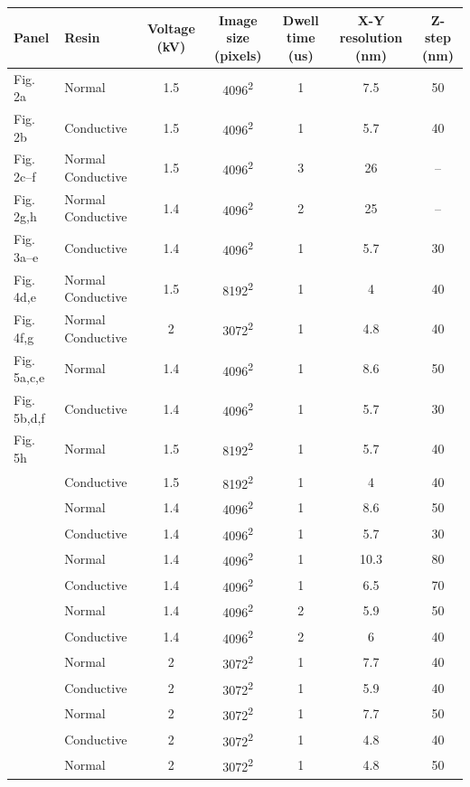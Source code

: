 \documentclass{article}
\begin{document}
\begin{center}\small
\begin{tabular}{llccccc}
\toprule
Panel & Resin & Voltage (kV) & Image size (pixels) & Dwell time (us) & X-Y resolution (nm) & Z-step (nm) \\
\midrule
Fig. 2a & Normal & 1.5 & 4096\textsuperscript{2} & 1 & 7.5 & 50 \\
Fig. 2b & Conductive & 1.5 & 4096\textsuperscript{2} & 1 & 5.7 & 40 \\
Fig. 2c–f & Normal Conductive & 1.5 & 4096\textsuperscript{2} & 3 & 26 & – \\
Fig. 2g,h & Normal Conductive & 1.4 & 4096\textsuperscript{2} & 2 & 25 & – \\
Fig. 3a–e & Conductive & 1.4 & 4096\textsuperscript{2} & 1 & 5.7 & 30 \\
Fig. 4d,e & Normal Conductive & 1.5 & 8192\textsuperscript{2} & 1 & 4 & 40 \\
Fig. 4f,g & Normal Conductive & 2 & 3072\textsuperscript{2} & 1 & 4.8 & 40 \\
Fig. 5a,c,e & Normal & 1.4 & 4096\textsuperscript{2} & 1 & 8.6 & 50 \\
Fig. 5b,d,f & Conductive & 1.4 & 4096\textsuperscript{2} & 1 & 5.7 & 30 \\
Fig. 5h & Normal & 1.5 & 8192\textsuperscript{2} & 1 & 5.7 & 40 \\
 & Conductive & 1.5 & 8192\textsuperscript{2} & 1 & 4 & 40 \\
 & Normal & 1.4 & 4096\textsuperscript{2} & 1 & 8.6 & 50 \\
 & Conductive & 1.4 & 4096\textsuperscript{2} & 1 & 5.7 & 30 \\
 & Normal & 1.4 & 4096\textsuperscript{2} & 1 & 10.3 & 80 \\
 & Conductive & 1.4 & 4096\textsuperscript{2} & 1 & 6.5 & 70 \\
 & Normal & 1.4 & 4096\textsuperscript{2} & 2 & 5.9 & 50 \\
 & Conductive & 1.4 & 4096\textsuperscript{2} & 2 & 6 & 40 \\
 & Normal & 2 & 3072\textsuperscript{2} & 1 & 7.7 & 40 \\
 & Conductive & 2 & 3072\textsuperscript{2} & 1 & 5.9 & 40 \\
 & Normal & 2 & 3072\textsuperscript{2} & 1 & 7.7 & 50 \\
 & Conductive & 2 & 3072\textsuperscript{2} & 1 & 4.8 & 40 \\
 & Normal & 2 & 3072\textsuperscript{2} & 1 & 4.8 & 50 \\

\end{tabular}
\end{center}
\end{document}
